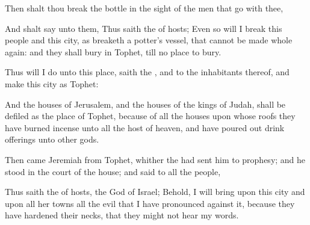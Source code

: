 {\par }{\PP {}Then shalt thou
break the
bottle in the
sight of the
men that
go with thee,

And shalt
say unto them, Thus
saith the
{} of
hosts; Even
so will I
break this
people and this
city, as
{}
breaketh a
potter’s
vessel, that
cannot be made whole
again: and they shall
bury
{} in
Tophet, till
{} no
place to
bury.

Thus will I
do unto this
place,
saith the
{}, and to the
inhabitants thereof, and
{}
make this
city as
Tophet:

And the
houses of
Jerusalem, and the
houses of the
kings of
Judah, shall be
defiled as the
place of
Tophet, because of all the
houses upon whose
roofs they have burned
incense unto all the
host of
heaven, and have poured
out drink
offerings unto
other
gods.

Then
came
Jeremiah from
Tophet, whither the
{} had
sent him to
prophesy; and he
stood in the
court of the
{}
house; and
said to all the
people,

Thus
saith the
{} of
hosts, the
God of
Israel; Behold, I will
bring upon this
city and upon all her
towns all the
evil that I have
pronounced against it, because they have
hardened their
necks, that they might not
hear my
words.




\par }
